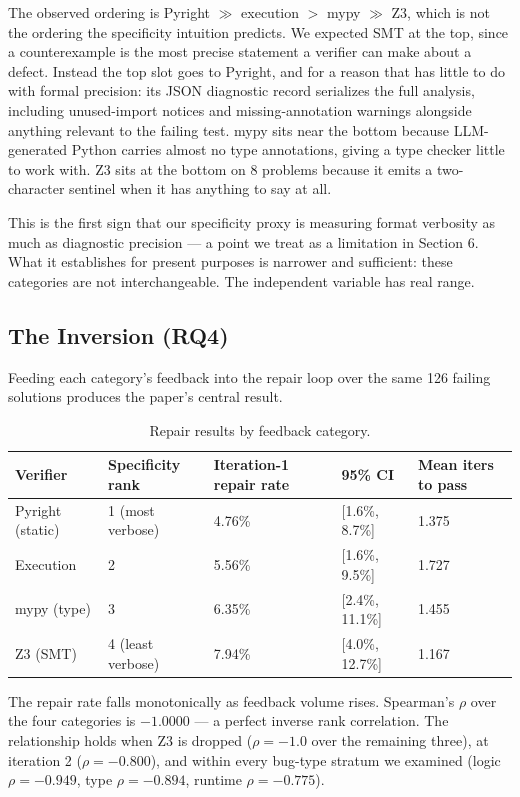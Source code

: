 The observed ordering is Pyright $\gg$ execution $>$ mypy $\gg$ Z3, which is not the ordering the specificity intuition predicts. We expected SMT at the top, since a counterexample is the most precise statement a verifier can make about a defect. Instead the top slot goes to Pyright, and for a reason that has little to do with formal precision: its JSON diagnostic record serializes the full analysis, including unused-import notices and missing-annotation warnings alongside anything relevant to the failing test. mypy sits near the bottom because LLM-generated Python carries almost no type annotations, giving a type checker little to work with. Z3 sits at the bottom on 8 problems because it emits a two-character sentinel when it has anything to say at all.

This is the first sign that our specificity proxy is measuring format verbosity as much as diagnostic precision --- a point we treat as a limitation in Section 6. What it establishes for present purposes is narrower and sufficient: these categories are not interchangeable. The independent variable has real range.

\subsection{The Inversion (RQ4)}

Feeding each category's feedback into the repair loop over the same 126 failing solutions produces the paper's central result.

\begin{table}[h]
\centering
\caption{Repair results by feedback category.}
\label{tab:repair}
\begin{tabular}{lllll}
\toprule
Verifier & Specificity rank & Iteration-1 repair rate & 95\% CI & Mean iters to pass \\
\midrule
Pyright (static) & 1 (most verbose) & 4.76\% & {[}1.6\%, 8.7\%{]} & 1.375 \\
Execution & 2 & 5.56\% & {[}1.6\%, 9.5\%{]} & 1.727 \\
mypy (type) & 3 & 6.35\% & {[}2.4\%, 11.1\%{]} & 1.455 \\
Z3 (SMT) & 4 (least verbose) & 7.94\% & {[}4.0\%, 12.7\%{]} & 1.167 \\
\bottomrule
\end{tabular}
\end{table}

The repair rate falls monotonically as feedback volume rises. Spearman's $\rho$ over the four categories is $\mathbf{-1.0000}$ --- a perfect inverse rank correlation. The relationship holds when Z3 is dropped ($\rho = -1.0$ over the remaining three), at iteration 2 ($\rho = -0.800$), and within every bug-type stratum we examined (logic $\rho = -0.949$, type $\rho = -0.894$, runtime $\rho = -0.775$).

